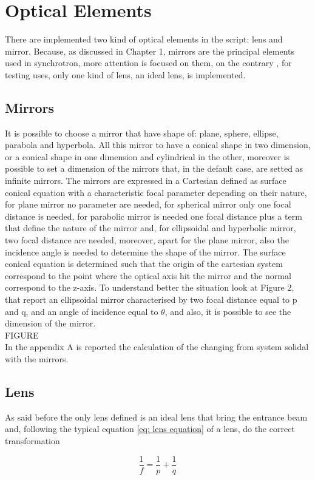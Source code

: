 \section{Optical Elements}
There are implemented two kind of optical elements in the script: lens and mirror. Because, as discussed in Chapter 1, mirrors are the principal elements used in synchrotron, more attention is focused on them, on the contrary , for testing uses, only one kind of lens, an ideal lens, is implemented. 
\subsection{Mirrors}
It is possible to choose a mirror that have shape of: plane, sphere, ellipse, parabola and hyperbola. All this mirror to have a conical shape in two dimension, or a conical shape in one dimension and cylindrical in the other, moreover is possible to set a dimension of the mirrors that, in the default case, are setted as infinite mirrors. The mirrors are expressed in a Cartesian defined as surface conical equation with a characteristic focal parameter depending on their nature, for plane mirror no parameter are needed, for spherical mirror only one focal distance is needed, for parabolic mirror is needed one focal distance plus a term that define the nature of the mirror and, for ellipsoidal and hyperbolic mirror, two focal distance are needed, moreover, apart for the plane mirror, also the incidence angle is needed to determine the shape of the mirror. The surface conical equation is determined such that the origin of the cartesian system correspond to the point where the optical axis hit the mirror and the normal correspond to the z-axis. To understand better the situation look at Figure 2, that report an ellipsoidal mirror characterised by two focal distance equal to p and q, and an angle of incidence equal to $\theta $, and also, it is possible to see the dimension of the mirror.
\\
FIGURE
\\
In the appendix A is reported the calculation of the changing from system solidal with the mirrors.
\subsection{Lens}
As said before the only lens defined is an ideal lens that bring the entrance beam and, following the typical equation \ref{eq: lens equation} of a lens, do the correct transformation

\begin{equation}
		\frac{1}{f} = \frac{1}{p} + \frac{1}{q}
		\label{eq: lens equation}
\end{equation}


